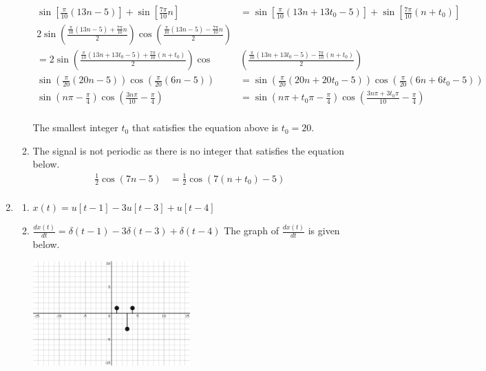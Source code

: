\documentclass[10pt,a4paper, margin=1in]{article}
\begin{document}
\begin{enumerate}
\begin{enumerate}
\begin{align*}
        \sin[\frac{\pi}{10} (13n - 5)] + \sin[\frac{7\pi}{10}n] & = \sin[\frac{\pi}{10}(13n + 13t_0 - 5)] + \sin[\frac{7\pi}{10}(n + t_0)] \\
        2\sin(\frac{\frac{\pi}{10} (13n - 5) + \frac{7\pi}{10}n}{2})\cos(\frac{\frac{\pi}{10} (13n - 5) - \frac{7\pi}{10}n}{2}) & \\
        = 2\sin(\frac{\frac{\pi}{10} (13n + 13t_0 - 5) + \frac{7\pi}{10}(n + t_0)}{2})\cos&(\frac{\frac{\pi}{10} (13n + 13t_0 - 5) - \frac{7\pi}{10}(n + t_0)}{2}) \\
        \sin(\frac{\pi}{20}(20n - 5))\cos(\frac{\pi}{20}(6n - 5)) & = \sin(\frac{\pi}{20}(20n + 20t_0 - 5))\cos(\frac{\pi}{20}(6n + 6t_0 - 5)) \\
        \sin(n\pi - \frac{\pi}{4})\cos(\frac{3n\pi}{10} - \frac{\pi}{4}) & = \sin(n\pi + t_0\pi - \frac{\pi}{4})\cos(\frac{3n\pi + 3t_0\pi}{10} - \frac{\pi}{4}) \\
    \end{align*}

    The smallest integer $t_0$ that satisfies the equation above is $t_0 = 20$.
	\item The signal is not periodic as there is no integer that satisfies the equation below.
    \begin{align*}
        \frac{1}{2}\cos(7n - 5) & = \frac{1}{2}\cos(7(n + t_0) - 5) \\
    \end{align*}
    \end{enumerate}

\item %
    \begin{enumerate}
    \item $x(t) = u[t-1] - 3u[t-3] + u[t-4]$
    \newpage %
    \item $\frac{dx(t)}{dt} = \delta(t-1) -3\delta(t-3) +\delta(t-4)$
        The graph of $\frac{dx(t)}{dt}$ is given below.
        \begin{center}
            \includegraphics*[width=0.5\textwidth]{assets/graphs/q5b.png}
        \end{center}
    \end{enumerate}    
    

\end{enumerate}
\end{document}
